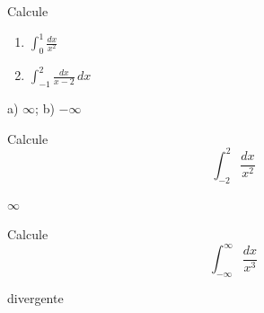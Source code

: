 \begin{exer}
  Calcule
  \begin{enumerate}
  \item $\displaystyle\int_{0}^1\frac{dx}{x^2}$
  \item $\displaystyle\int_{-1}^{2}\frac{dx}{x-2}\,dx$

  \end{enumerate}
\end{exer}
\begin{resp}
  a) $\infty$; b) $-\infty$
\end{resp}

\begin{exer}
  Calcule
  \begin{equation}
    \int_{-2}^2\frac{dx}{x^2}
  \end{equation}
\end{exer}
\begin{resp}
  $\infty$
\end{resp}

\begin{exer}
  Calcule
  \begin{equation}
    \int_{-\infty}^{\infty} \frac{dx}{x^3}
  \end{equation}
\end{exer}
\begin{resp}
  divergente
\end{resp}
